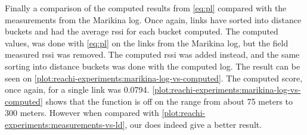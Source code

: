 Finally a comparison of the computed results from \autoref{eq:pl} compared with the measurements from the Marikina log. Once again, links have sorted into distance buckets and had the average \gls{rssi} for each bucket computed. The computed values, was done with \autoref{eq:pl} on the links from the Marikina log, but the field measured \gls{rssi} was removed. The computed \gls{rssi} was added instead, and the same sorting into distance buckets was done with the computed log. The result can be seen on \autoref{plot:reachi-experiments:marikina-log-vs-computed}. The computed score, once again, for a single link was 0.0794. \autoref{plot:reachi-experiments:marikina-log-vs-computed} shows that the function is off on the range from about 75 meters to 300 meters. However when compared with \autoref{plot:reachi-experiments:measurements-vs-ld}, our does indeed give a better result.